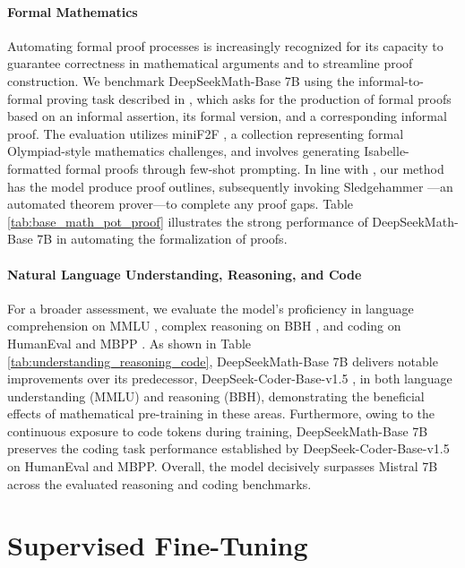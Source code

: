 \begin{itemize}[topsep=0pt]
\paragraph{Formal Mathematics}

Automating formal proof processes is increasingly recognized for its capacity to guarantee correctness in mathematical arguments and to streamline proof construction. We benchmark DeepSeekMath-Base 7B using the informal-to-formal proving task described in \citep{dsp_proof}, which asks for the production of formal proofs based on an informal assertion, its formal version, and a corresponding informal proof. The evaluation utilizes miniF2F \citep{minif2f}, a collection representing formal Olympiad-style mathematics challenges, and involves generating Isabelle-formatted formal proofs through few-shot prompting. In line with \cite{dsp_proof}, our method has the model produce proof outlines, subsequently invoking Sledgehammer \citep{sledgehammer}—an automated theorem prover—to complete any proof gaps. Table \ref{tab:base_math_pot_proof} illustrates the strong performance of DeepSeekMath-Base 7B in automating the formalization of proofs.

\paragraph{Natural Language Understanding, Reasoning, and Code}

For a broader assessment, we evaluate the model’s proficiency in language comprehension on MMLU \citep{mmlu}, complex reasoning on BBH \citep{bbh}, and coding on HumanEval \citep{codex} and MBPP \citep{mbpp}. As shown in Table \ref{tab:understanding_reasoning_code}, DeepSeekMath-Base 7B delivers notable improvements over its predecessor, DeepSeek-Coder-Base-v1.5 \citep{deepseek-coder}, in both language understanding (MMLU) and reasoning (BBH), demonstrating the beneficial effects of mathematical pre-training in these areas. Furthermore, owing to the continuous exposure to code tokens during training, DeepSeekMath-Base 7B preserves the coding task performance established by DeepSeek-Coder-Base-v1.5 on HumanEval and MBPP. Overall, the model decisively surpasses Mistral 7B \citep{mistral} across the evaluated reasoning and coding benchmarks.

\section{Supervised Fine-Tuning}


\end{itemize}
